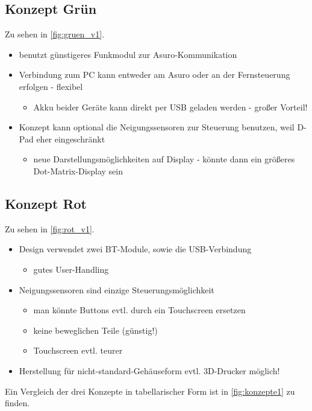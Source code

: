 \subsection{Konzept Grün}
Zu sehen in \autoref{fig:gruen_v1}.
\begin{itemize}
	\item benutzt günstigeres Funkmodul zur Asuro-Kommunikation
	\item Verbindung zum PC kann entweder am Asuro oder an der Fernsteuerung erfolgen - flexibel
	\begin{itemize}
		\item Akku beider Geräte kann direkt per USB geladen werden - großer Vorteil!
	\end{itemize}
	\item Konzept kann optional die Neigungssensoren zur Steuerung benutzen, weil D-Pad eher eingeschränkt
	\begin{itemize}
		\item neue Darstellungsmöglichkeiten auf Display - könnte dann ein größeres Dot-Matrix-Display sein
	\end{itemize}
\end{itemize}

\subsection{Konzept Rot}
Zu sehen in \autoref{fig:rot_v1}.
\begin{itemize}
	\item Design verwendet zwei BT-Module, sowie die USB-Verbindung
	\begin{itemize}
		\item gutes User-Handling
	\end{itemize}
	\item Neigungssensoren sind einzige Steuerungsmöglichkeit
	\begin{itemize}
		\item man könnte Buttons evtl. durch ein Touchscreen ersetzen
		\item keine beweglichen Teile (günstig!)
		\item Touchscreen evtl. teurer
	\end{itemize}
	\item Herstellung für nicht-standard-Gehäuseform evtl. 3D-Drucker möglich!
\end{itemize}

Ein Vergleich der drei Konzepte in tabellarischer Form ist in \autoref{fig:konzepte1} zu finden.
